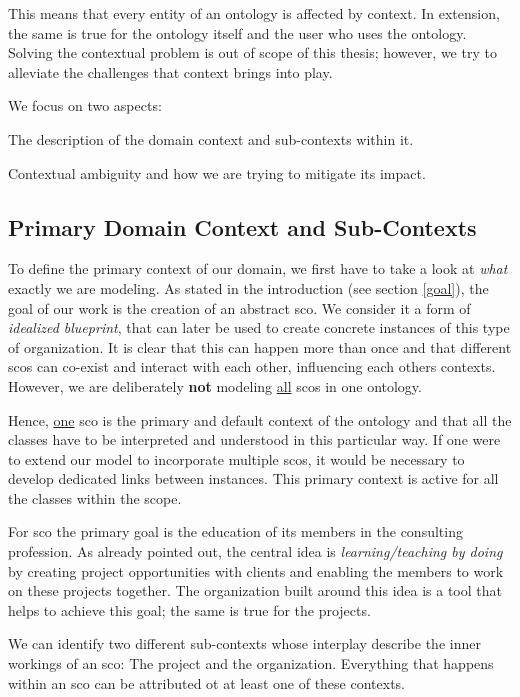 \documentclass[a4paper, DIV=13, BCOR=0cm]{scrbook}
\begin{document}
This means that every entity of an ontology is affected by context. In extension, the same is true for the ontology itself and the user who uses the ontology. Solving the contextual problem is out of scope of this thesis; however, we try to alleviate the challenges that context brings into play.

We focus on two aspects:
\begin{inparaenum}
	\item The description of the domain context and sub-contexts within it.
	\item Contextual ambiguity and how we are trying to mitigate its impact.
\end{inparaenum}

\subsection{Primary Domain Context and Sub-Contexts}
To define the primary context of our domain, we first have to take a look at \textit{what} exactly we are modeling. As stated in the introduction (see section \ref{goal}), the goal of our work is the creation of an abstract \gls{sco}. We consider it a form of \textit{idealized blueprint}, that can later be used to create concrete instances of this type of organization. It is clear that this can happen more than once and that different \glspl{sco} can co-exist and interact with each other, influencing each others contexts. However, we are deliberately \textbf{not} modeling \underline{all} \glspl{sco} in one ontology.

Hence, \underline{one} \gls{sco} is the primary and default context of the ontology and that all the classes have to be interpreted and understood in this particular way. If one were to extend our model to incorporate multiple \glspl{sco}, it would be necessary to develop dedicated links between instances. This primary context is active for all the classes within the scope.

For \gls{sco} the primary goal is the education of its members in the consulting profession. As already pointed out, the central idea is \textit{learning/teaching by doing} by creating project opportunities with clients and enabling the members to work on these projects together. The organization built around this idea is a tool that helps to achieve this goal; the same is true for the projects.

We can identify two different sub-contexts whose interplay describe the inner workings of an \gls{sco}: The project and the organization. Everything that happens within an \gls{sco} can be attributed ot at least one of these contexts.
\end{document}
